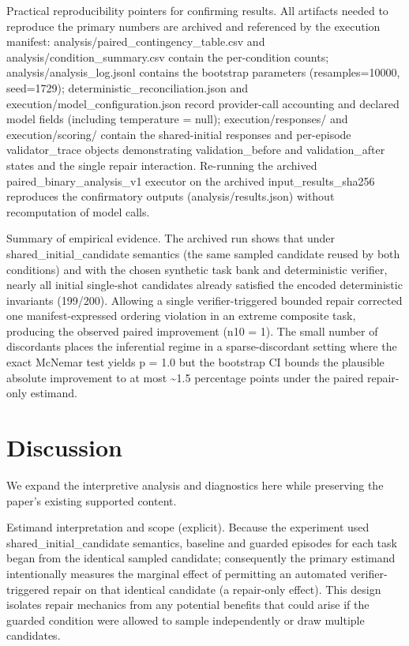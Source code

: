 \documentclass[conference]{IEEEtran}
\begin{document}
Practical reproducibility pointers for confirming results. All artifacts needed to reproduce the primary numbers are archived and referenced by the execution manifest: analysis/paired\_contingency\_table.csv and analysis/condition\_summary.csv contain the per-condition counts; analysis/analysis\_log.jsonl contains the bootstrap parameters (resamples=10000, seed=1729); deterministic\_reconciliation.json and execution/model\_configuration.json record provider-call accounting and declared model fields (including temperature = null); execution/responses/ and execution/scoring/ contain the shared-initial responses and per-episode validator\_trace objects demonstrating validation\_before and validation\_after states and the single repair interaction. Re-running the archived paired\_binary\_analysis\_v1 executor on the archived input\_results\_sha256 reproduces the confirmatory outputs (analysis/results.json) without recomputation of model calls.

Summary of empirical evidence. The archived run shows that under shared\_initial\_candidate semantics (the same sampled candidate reused by both conditions) and with the chosen synthetic task bank and deterministic verifier, nearly all initial single-shot candidates already satisfied the encoded deterministic invariants (199/200). Allowing a single verifier-triggered bounded repair corrected one manifest-expressed ordering violation in an extreme composite task, producing the observed paired improvement (n10 = 1). The small number of discordants places the inferential regime in a sparse-discordant setting where the exact McNemar test yields p = 1.0 but the bootstrap CI bounds the plausible absolute improvement to at most \textasciitilde{}1.5 percentage points under the paired repair-only estimand.

\section{Discussion}
We expand the interpretive analysis and diagnostics here while preserving the paper's existing supported content.

Estimand interpretation and scope (explicit). Because the experiment used shared\_initial\_candidate semantics, baseline and guarded episodes for each task began from the identical sampled candidate; consequently the primary estimand intentionally measures the marginal effect of permitting an automated verifier-triggered repair on that identical candidate (a repair-only effect). This design isolates repair mechanics from any potential benefits that could arise if the guarded condition were allowed to sample independently or draw multiple candidates.
\end{document}
